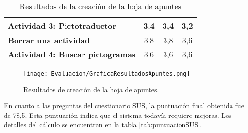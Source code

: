 \begin{table}[H]
{\begin{tabular}{l|c|c|c|}
            \multicolumn{1}{|l|}{\textbf{Actividad 3: Pictotraductor}}      & 3,4                                                                                                                                               & 3,4                                                                                                                                                                       & 3,2                                                                                                                                                                                      \\ \hline
            \multicolumn{1}{|l|}{\textbf{Borrar una actividad}}             & 3,8                                                                                                                                               & 3,8                                                                                                                                                                       & 3,6                                                                                                                                                                                      \\ \hline
            \multicolumn{1}{|l|}{\textbf{Actividad 4: Buscar pictogramas}}  & 3,6                                                                                                                                               & 3,6                                                                                                                                                                       & 3,6                                                                                                                                                                                      \\ \hline
        \end{tabular}
    }
    \caption{Resultados de la creación de la hoja de apuntes}
    \label{tab:resultadosApuntes}
\end{table}

\begin{figure}[ht!]
    \centering
    \texttt{[image: Evaluacion/GraficaResultadosApuntes.png]}
    \caption{Resultados de creación de la hoja de apuntes.}
    \label{fig:resultadosApuntes}
\end{figure}

En cuanto a las preguntas del cuestionario SUS, la puntuación final obtenida fue de 78,5. Esta puntuación indica que el sistema todavía requiere mejoras. Los detalles del cálculo se encuentran en la tabla \ref{tab:puntuacionSUS}.

